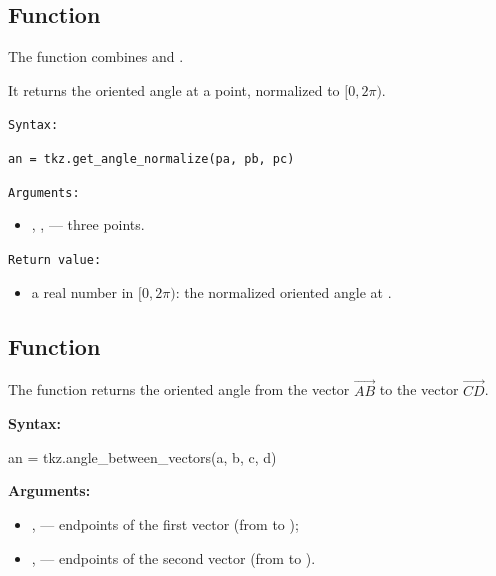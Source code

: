 

\subsection{Function }
\label{sub:tkz.get_angle_normalize}

The function  combines
 and .

It returns the oriented angle at a point, normalized to $[0, 2\pi)$.

\medskip
\texttt{Syntax: }

\begin{mybox}
\verb|an = tkz.get_angle_normalize(pa, pb, pc)|
\end{mybox}

\medskip
\texttt{Arguments: }
\begin{itemize}
  \item {}, ,  — three points.
\end{itemize}

\medskip
\texttt{Return value: }
\begin{itemize}
  \item a real number in $[0, 2\pi)$: the normalized oriented angle at .
\end{itemize}


\subsection{Function }
\label{sub:tkz_angle_between_vectors}

The function  returns the oriented angle
from the vector $\overrightarrow{AB}$ to the vector $\overrightarrow{CD}$.

\medskip
\noindent\textbf{Syntax:}
\begin{mybox}
an = tkz.angle\_between\_vectors(a, b, c, d)
\end{mybox}

\noindent\textbf{Arguments:}
\begin{itemize}
  \item {},  --- endpoints of the first vector (from  to );
  \item {},  --- endpoints of the second vector (from  to ).
\end{itemize}

